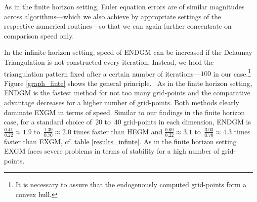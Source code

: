 \documentclass[a4paper,12pt]{article}%
\begin{document}
As in the finite horizon setting, Euler equation errors are of similar magnitudes across algorithms---which we also achieve by appropriate settings of the respective numerical routines---so that we can again further concentrate on comparison speed only.

In the infinite horizon setting, speed of ENDGM can be increased if the Delaunay Triangulation is not constructed every iteration. Instead, we hold the triangulation pattern fixed after a certain number of iterations---$100$
in our case.\footnote{It is necessary to assure that the endogenously computed grid-points form a convex hull.} Figure \ref{graph_finte} shows the general principle. \ As in the finite horizon setting, ENDGM is the fastest method for not too many grid-points and the comparative advantage decreases for a higher number of grid-points. Both methods clearly dominate EXGM in terms of speed. Similar to our findings in the finite horizon case, for a standard choice of~$20$ to~$40$ grid-points in each dimension, ENDGM is $\frac{0.41}{0.22}\approx1.9$ to~$\frac{1.39}{0.70}\approx2.0$ times faster than HEGM and $\frac{0.69}{0.22}\approx3.1$ to~$\frac{3.03}{0.70}\approx4.3$ times faster than EXGM, cf. table \ref{results_infinte}. As in the finite horizon setting EXGM faces severe problems in terms of stability for a high number of grid-points.
\end{document}
